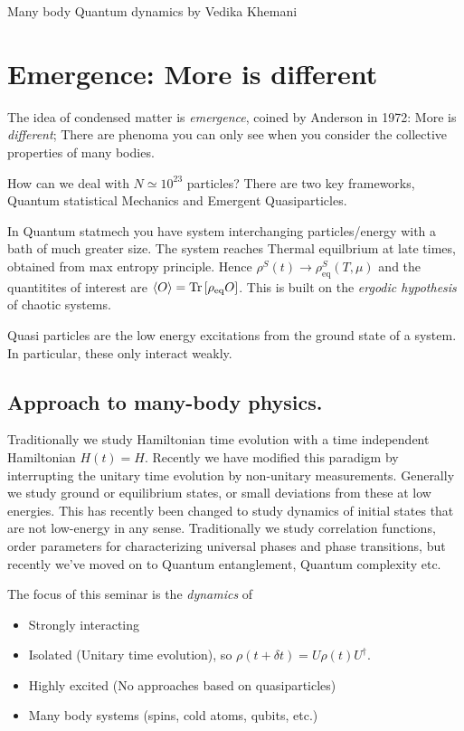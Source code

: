 \documentclass[a4paper]{article}
\author{Oscar Emil Sommer}
\begin{document}
Many body Quantum dynamics by Vedika Khemani
\section{Emergence: More is different}
The idea of condensed matter is \emph{emergence}, coined by Anderson in 1972:
More is \emph{different}; There are phenoma you can only see when you consider
the collective properties of many bodies.

How can we deal with $N\simeq 10^{23}$ particles? There are two key
frameworks, Quantum statistical Mechanics and Emergent Quasiparticles.

In Quantum statmech you have system interchanging particles/energy with a bath
of much greater size. The system reaches Thermal equilbrium at late times,
obtained from max entropy principle. Hence $\rho^S(t)\to
\rho^S_\mathrm{eq}(T,\mu)$ and the quantitites of interest are
$\braket{O}=\operatorname{Tr}\left[\rho_\mathrm{eq} O\right]$. This is built on the
\emph{ergodic hypothesis} of chaotic systems.

Quasi particles are the low energy excitations from the ground state of
a system. In particular, these only interact weakly.

\subsection{Approach to many-body physics.}
Traditionally we study Hamiltonian time evolution with a time independent
Hamiltonian $H(t)=H$. Recently we have modified this paradigm by interrupting
the unitary time evolution by non-unitary measurements. Generally we study
ground or equilibrium states, or small deviations from these at low energies.
This has recently been changed to study dynamics of initial states that are not
low-energy in any sense. Traditionally we study correlation functions, order
parameters for characterizing universal phases and phase transitions, but
recently we've moved on to Quantum entanglement, Quantum complexity etc.

The focus of this seminar is the \emph{dynamics} of 
\begin{itemize}
    \item Strongly interacting
    \item Isolated (Unitary time evolution), so $\rho(t+\delta
        t)=U\rho(t) U^\dagger$.
    \item Highly excited (No approaches based on quasiparticles)
    \item Many body systems (spins, cold atoms, qubits, etc.)
\end{itemize}
\end{document}
